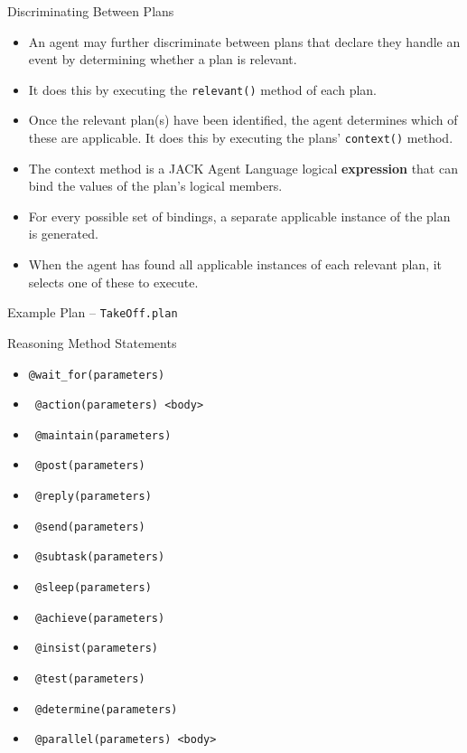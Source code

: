 \documentclass[aspectratio=1610,xcolor=dvipsnames,t]{beamer}
\newcommand{\showcode}[1]{\begin{mdframed}[style=code] %
                          \end{mdframed}%
}
\begin{document}
\begin{frame}{Discriminating Between Plans} 
    \begin{itemize}
        \item An agent may further discriminate between plans 
              that declare they handle an event by determining 
              whether a plan is relevant. 
        \item It does this by executing the \texttt{relevant()} method of each plan. 
        \item Once the relevant plan(s) have been identified, 
              the agent determines which of these are applicable. 
              It does this by executing the plans' \texttt{context()} method. 
          \item The context method is a JACK Agent Language logical \textbf{expression} 
              that can bind the values of the plan's logical members. 
        \item For every possible set of bindings, a separate applicable instance 
              of the plan is generated.
        \item When the agent has found all applicable instances of 
              each relevant plan, it selects one of these to execute.
    \end{itemize}
\end{frame}

\begin{frame}{Example Plan -- \texttt{TakeOff.plan}}
    \showcode{takeoffplan.java} 
\end{frame}

\begin{frame}{Reasoning Method Statements} 
    \begin{itemize}
        \item \texttt{@wait\_for(parameters)} 
        \item \texttt{ @action(parameters) <body> }
        \item \texttt{ @maintain(parameters) } 
        \item \texttt{ @post(parameters) }
        \item \texttt{ @reply(parameters) }
        \item \texttt{ @send(parameters) }
        \item \texttt{ @subtask(parameters) }
        \item \texttt{ @sleep(parameters) }
        \item \texttt{ @achieve(parameters) } 
        \item \texttt{ @insist(parameters) } 
        \item \texttt{ @test(parameters) } 
        \item \texttt{ @determine(parameters) } 
        \item \texttt{ @parallel(parameters) <body> } 
    \end{itemize}
\end{frame} 
\end{document}
